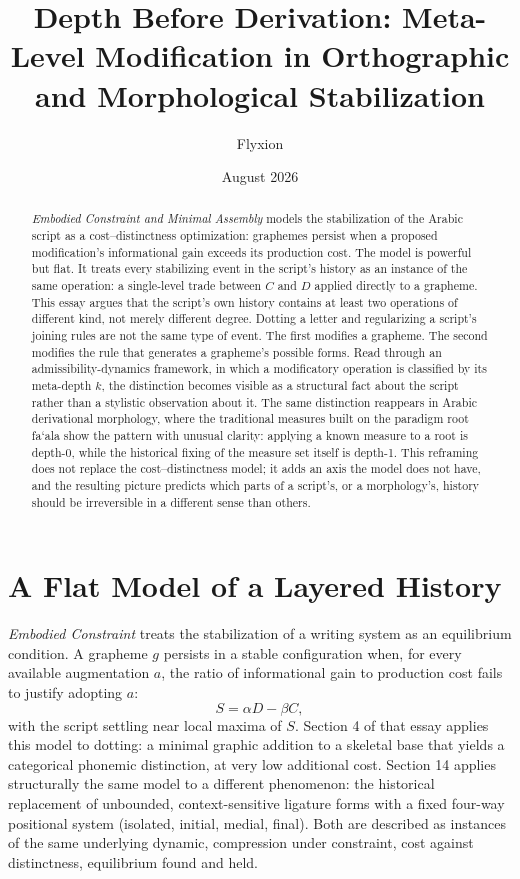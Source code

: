 \documentclass[11pt]{article}
\title{Depth Before Derivation: Meta-Level Modification in Orthographic and Morphological Stabilization}
\author{Flyxion}
\date{August 2026}
\begin{document}
\maketitle

\begin{abstract}
\emph{Embodied Constraint and Minimal Assembly} models the stabilization of the
Arabic script as a cost--distinctness optimization: graphemes persist when a
proposed modification's informational gain exceeds its production cost. The
model is powerful but flat. It treats every stabilizing event in the script's
history as an instance of the same operation: a single-level trade between
$C$ and $D$ applied directly to a grapheme. This essay argues that the
script's own history contains at least two operations of different kind, not
merely different degree. Dotting a letter and regularizing a script's
joining rules are not the same type of event. The first modifies a grapheme.
The second modifies the rule that generates a grapheme's possible forms. Read
through an admissibility-dynamics framework, in which a modificatory
operation is classified by its meta-depth $k$, the distinction becomes
visible as a structural fact about the script rather than a stylistic
observation about it. The same distinction reappears in Arabic derivational
morphology, where the traditional measures built on the paradigm root
fa`ala show the pattern with unusual clarity: applying a known measure to a
root is depth-0, while the historical fixing of the measure set itself is
depth-1. This reframing does not replace the cost--distinctness model; it
adds an axis the model does not have, and the resulting picture predicts
which parts of a script's, or a morphology's, history should be
irreversible in a different sense than others.
\end{abstract}

\section{A Flat Model of a Layered History}

\emph{Embodied Constraint} treats the stabilization of a writing system as an
equilibrium condition. A grapheme $g$ persists in a stable configuration when,
for every available augmentation $a$, the ratio of informational gain to
production cost fails to justify adopting $a$:
\[
S = \alpha D - \beta C,
\]
with the script settling near local maxima of $S$. Section 4 of that essay
applies this model to dotting: a minimal graphic addition to a skeletal base
that yields a categorical phonemic distinction, at very low additional cost.
Section 14 applies structurally the same model to a different phenomenon:
the historical replacement of unbounded, context-sensitive ligature forms
with a fixed four-way positional system (isolated, initial, medial, final).
Both are described as instances of the same underlying dynamic, compression
under constraint, cost against distinctness, equilibrium found and held.
\end{document}
